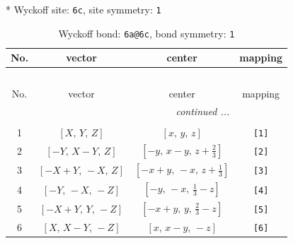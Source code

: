 \documentclass[fleqn,8pt]{jsarticle}
\begin{document}
* Wyckoff site: {\tt 6c}, site symmetry: {\tt 1}
\renewcommand{\arraystretch}{1.2}
\begin{longtable}{cccc}
\caption{Wyckoff bond: {\tt 6a@6c}, bond symmetry: {\tt 1}}
 \\
 \hline \hline
No. & vector & center & mapping \\ \hline \endfirsthead

\multicolumn{3}{l}{\tablename\ \thetable{}} \\
 \hline \hline
No. & vector & center & mapping \\ \hline \endhead

 \hline \hline
\multicolumn{3}{r}{\footnotesize\it continued ...} \\ \endfoot

 \hline \hline
\multicolumn{3}{r}{} \\ \endlastfoot

1 & $\left[ X,\, Y,\, Z \right]$ & $\left[ x,\, y,\, z \right]$ & {\tt [1]} \\ \hline
2 & $\left[ - Y,\, X - Y,\, Z \right]$ & $\left[ - y,\, x - y,\, z + \frac{2}{3} \right]$ & {\tt [2]} \\ \hline
3 & $\left[ - X + Y,\, - X,\, Z \right]$ & $\left[ - x + y,\, - x,\, z + \frac{1}{3} \right]$ & {\tt [3]} \\ \hline
4 & $\left[ - Y,\, - X,\, - Z \right]$ & $\left[ - y,\, - x,\, \frac{1}{3} - z \right]$ & {\tt [4]} \\ \hline
5 & $\left[ - X + Y,\, Y,\, - Z \right]$ & $\left[ - x + y,\, y,\, \frac{2}{3} - z \right]$ & {\tt [5]} \\ \hline
6 & $\left[ X,\, X - Y,\, - Z \right]$ & $\left[ x,\, x - y,\, - z \right]$ & {\tt [6]} \\
\end{longtable}
\end{document}
